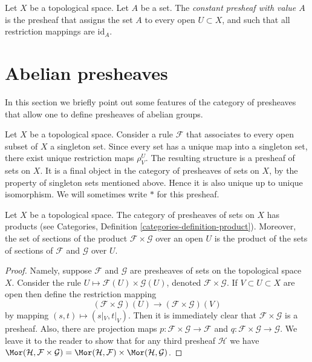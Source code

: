 \begin{definition}
\label{definition-constant-presheaf}
Let $X$ be a topological space. Let $A$ be a set.
The {\it constant presheaf with value $A$} is the
presheaf that assigns the set $A$ to every open
$U \subset X$, and such that all restriction mappings
are $\text{id}_A$.
\end{definition}

\section{Abelian presheaves}
\label{section-abelian-presheaves}

\noindent
In this section we briefly point out some features of the
category of presheaves that allow one to define presheaves
of abelian groups.

\begin{example}
\label{example-singleton-presheaf}
Let $X$ be a topological space. Consider a rule $\mathcal{F}$ that
associates to every open subset of $X$ a singleton set. Since every set
has a unique map into a singleton set, there exist unique restriction
maps $\rho^U_V$. The resulting structure is a presheaf of sets on $X$.
It is a final object in the category of presheaves of sets on $X$, by the
property of singleton sets mentioned above. Hence it is
also unique up to unique isomorphism. We will sometimes write $*$
for this presheaf.
\end{example}

\begin{lemma}
\label{lemma-product-presheaves}
Let $X$ be a topological space. The category of presheaves of sets
on $X$ has products (see
Categories, Definition \ref{categories-definition-product}).
Moreover, the set of
sections of the product $\mathcal{F} \times \mathcal{G}$
over an open $U$ is the product of the sets of sections of
$\mathcal{F}$ and $\mathcal{G}$ over $U$.
\end{lemma}

\begin{proof}
Namely, suppose $\mathcal{F}$ and $\mathcal{G}$ are
presheaves of sets on the topological space $X$.
Consider the rule $U \mapsto \mathcal{F}(U) \times \mathcal{G}(U)$,
denoted $\mathcal{F} \times \mathcal{G}$. If $V \subset U \subset X$
are open then define the restriction mapping
$$
(\mathcal{F} \times \mathcal{G})(U)
\longrightarrow
(\mathcal{F} \times \mathcal{G})(V)
$$
by mapping $(s, t) \mapsto (s|_V, t|_V)$. Then it is immediately
clear that $\mathcal{F} \times \mathcal{G}$ is a presheaf.
Also, there are projection maps
$p : \mathcal{F} \times \mathcal{G} \to \mathcal{F}$
and
$q : \mathcal{F} \times \mathcal{G} \to \mathcal{G}$.
We leave it to the reader to show that
for any third presheaf $\mathcal{H}$ we have
$\Mor(\mathcal{H}, \mathcal{F} \times \mathcal{G})
= \Mor(\mathcal{H}, \mathcal{F}) \times
\Mor(\mathcal{H}, \mathcal{G})$.
\end{proof}

